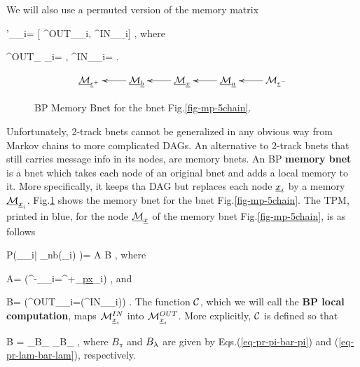 We will also use a permuted version of the 
memory matrix

\beq
\calm'_{\rvx_i}=
[
\calm^{OUT}_{\rvx_i},
\calm^{IN}_{\rvx_i}]
\;,
\eeq
where

\beq
\calm^{OUT}_{ \rvx_i}=
\;, 
\;\;\;
\calm^{IN}_{\rvx_i}=
\;.
\eeq

\begin{figure}[h!]
$$\xymatrix{
\ucalm_{\rveps^+}
&
\ucalm_\rvb\ar[l]
&
\ucalm_\rvx\ar[l]
&
\ucalm_\rva\ar[l]
&
\calm_{\rveps^-}\ar[l]
}$$
\caption{BP Memory Bnet for the bnet
Fig.\ref{fig-mp-5chain}. }
\label{fig-mem-5chain}
\end{figure}

Unfortunately,
2-track bnets cannot be
 generalized in any
obvious way  from 
Markov chains to more
complicated DAGs.
An alternative to 2-track bnets
that still
carries message
info in its nodes,
are memory bnets. An BP
{\bf memory bnet}
is a bnet 
which takes each node
of an original
bnet and
adds a local memory to it.
More specifically,
it keeps tha DAG
but replaces each node
${\underline{x}}_i$
by a memory $\underline{{\cal M}}_{{\underline{x}}_i}$.
Fig.\ref{fig-mem-5chain} shows 
the memory bnet for
the bnet Fig.\ref{fig-mp-5chain}.
The TPM, printed in blue,
for the  node $\underline{{\cal M}}_{\underline{x}}$
of the memory bnet 
Fig.\ref{fig-mp-5chain}, is as follows

\beq\color{blue}
P(\calm_{\rvx_i}|
\calm_{\rvn\in nb(\rvx_i)}
)= A B
\;,
\eeq
where

\beq
A=
\indi(\calm^{-}_{\rvx_i}=\calm^{+}_{\ul{px}_i})
\;,
\eeq
and

\beq
B=
\indi(\calm^{OUT}_{\rvx_i}=\calc(\calm^{IN}_{\rvx_i}))
\label{eq-mp-update-static}
\;.
\eeq
The function ${\cal C}$,
which 
we will call the {\bf BP local computation},
maps ${\cal M}^{IN}_{{\underline{x}}_i}$
into ${\cal M}^{OUT}_{{\underline{x}}_i}$. More explicitly,
${\cal C}$ is defined so that

\beq
B
=
_{B_\pi}
_{B_\pi}
\;,
\eeq
where
$B_\pi$ and $B_\lambda$
are given by Eqs.(\ref{eq-pr-pi-bar-pi})
and (\ref{eq-pr-lam-bar-lam}),
respectively.




